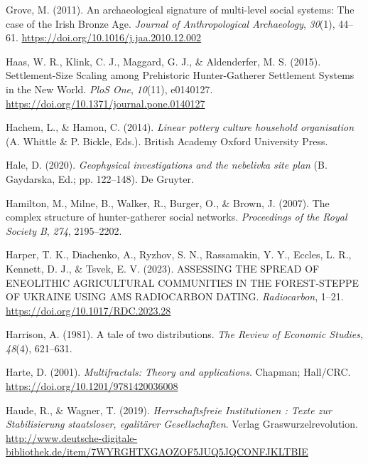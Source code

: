 \documentclass[
  12pt,
]{book}
\newlength{\cslhangindent}
\newlength{\cslentryspacingunit} %
\newenvironment{CSLReferences}[2] %
 {%
  \setlength{\parindent}{0pt}
  \ifodd #1
  \let\oldpar\par
  \def\par{\hangindent=\cslhangindent\oldpar}
  \fi
  \setlength{\parskip}{#2\cslentryspacingunit}
 }%
 {}
\begin{document}
\begin{CSLReferences}{1}{0}
\leavevmode{}%
Grove, M. (2011). An archaeological signature of multi-level social systems: The case of the Irish Bronze Age. \emph{Journal of Anthropological Archaeology}, \emph{30}(1), 44--61. \url{https://doi.org/10.1016/j.jaa.2010.12.002}

\leavevmode{}%
Haas, W. R., Klink, C. J., Maggard, G. J., \& Aldenderfer, M. S. (2015). Settlement-Size Scaling among Prehistoric Hunter-Gatherer Settlement Systems in the New World. \emph{PloS One}, \emph{10}(11), e0140127. \url{https://doi.org/10.1371/journal.pone.0140127}

\leavevmode{}%
Hachem, L., \& Hamon, C. (2014). \emph{Linear pottery culture household organisation} (A. Whittle \& P. Bickle, Eds.). British Academy Oxford University Press.

\leavevmode{}%
Hale, D. (2020). \emph{Geophysical investigations and the nebelivka site plan} (B. Gaydarska, Ed.; pp. 122--148). De Gruyter.

\leavevmode{}%
Hamilton, M., Milne, B., Walker, R., Burger, O., \& Brown, J. (2007). The complex structure of hunter-gatherer social networks. \emph{Proceedings of the Royal Society B}, \emph{274}, 2195--2202.

\leavevmode{}%
Harper, T. K., Diachenko, A., Ryzhov, S. N., Rassamakin, Y. Y., Eccles, L. R., Kennett, D. J., \& Tsvek, E. V. (2023). ASSESSING THE SPREAD OF ENEOLITHIC AGRICULTURAL COMMUNITIES IN THE FOREST-STEPPE OF UKRAINE USING AMS RADIOCARBON DATING. \emph{Radiocarbon}, 1--21. \url{https://doi.org/10.1017/RDC.2023.28}

\leavevmode{}%
Harrison, A. (1981). A tale of two distributions. \emph{The Review of Economic Studies}, \emph{48}(4), 621--631.

\leavevmode{}%
Harte, D. (2001). \emph{Multifractals: Theory and applications}. Chapman; Hall/CRC. \url{https://doi.org/10.1201/9781420036008}

\leavevmode{}%
Haude, R., \& Wagner, T. (2019). \emph{Herrschaftsfreie Institutionen : Texte zur Stabilisierung staatsloser, egalitärer Gesellschaften}. Verlag Graswurzelrevolution. \url{http://www.deutsche-digitale-bibliothek.de/item/7WYRGHTXGAOZOF5JUQ5JQCONFJKLTBIE}


\end{CSLReferences}
\end{document}
